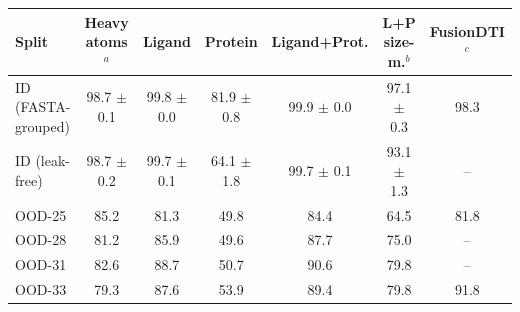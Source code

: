 \begin{tabular}{lcccccc}
\toprule
Split & Heavy atoms$^a$ & Ligand & Protein & Ligand+Prot. & L+P size-m.$^b$ & FusionDTI$^c$ \\
\midrule
ID (FASTA-grouped) & 98.7 $\pm$ 0.1 & 99.8 $\pm$ 0.0 & 81.9 $\pm$ 0.8 & 99.9 $\pm$ 0.0 & 97.1 $\pm$ 0.3 & 98.3 \\
ID (leak-free) & 98.7 $\pm$ 0.2 & 99.7 $\pm$ 0.1 & 64.1 $\pm$ 1.8 & 99.7 $\pm$ 0.1 & 93.1 $\pm$ 1.3 & -- \\
OOD-25 & 85.2 & 81.3 & 49.8 & 84.4 & 64.5 & 81.8 \\
OOD-28 & 81.2 & 85.9 & 49.6 & 87.7 & 75.0 & -- \\
OOD-31 & 82.6 & 88.7 & 50.7 & 90.6 & 79.8 & -- \\
OOD-33 & 79.3 & 87.6 & 53.9 & 89.4 & 79.8 & 91.8 \\
\bottomrule
\end{tabular}
